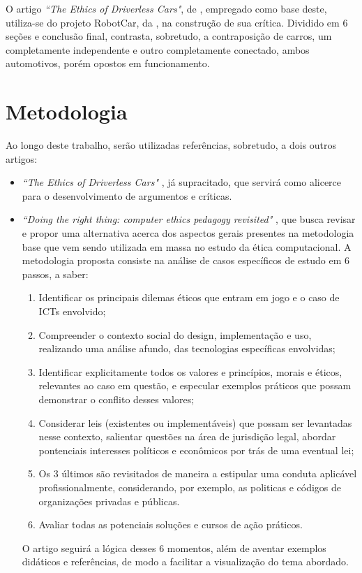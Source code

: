 \documentclass[12pt]{article}
\begin{document}
		O artigo \emph{``The Ethics of Driverless Cars"}, de \citet{mcbride_ethics_2016}, empregado como base deste, utiliza-se do projeto RobotCar, da \citet{oxford_robotics_institute_robotcar_nodate}, na construção de sua crítica. Dividido em 6 seções e conclusão final, contrasta, sobretudo, a contraposição de carros, um completamente independente e outro completamente conectado, ambos automotivos, porém opostos em funcionamento.
		
	\section{\label{metodologia}Metodologia} 
		
		Ao longo deste trabalho, serão utilizadas referências, sobretudo, a dois outros artigos:
		\begin{itemize}
			\item \emph{``The Ethics of Driverless Cars"} \citep{mcbride_ethics_2016}, já supracitado, que servirá como alicerce para o desenvolvimento de argumentos e críticas.
			\item \emph{``Doing the right thing: computer ethics pedagogy revisited"} \citep{jones_doing_2016}, que busca revisar e propor uma alternativa acerca dos aspectos gerais presentes na metodologia base que vem sendo utilizada em massa no estudo da ética computacional. A metodologia proposta consiste na análise de casos específicos de estudo em 6 passos, a saber:
			\begin{enumerate}
				\item Identificar os principais dilemas éticos que entram em jogo e o caso de ICTs envolvido;
				\item Compreender o contexto social do design, implementação e uso, realizando uma análise afundo, das tecnologias específicas envolvidas;
				\item Identificar explicitamente todos os valores e princípios, morais e éticos, relevantes ao caso em questão, e especular exemplos práticos que possam demonstrar o conflito desses valores;
				\item Considerar leis (existentes ou implementáveis) que possam ser levantadas nesse contexto, salientar questões na área de jurisdição legal, abordar pontenciais interesses políticos e econômicos por trás de uma eventual lei;
				\item Os 3 últimos são revisitados de maneira a estipular uma conduta aplicável profissionalmente, considerando, por exemplo, as politicas e códigos de organizações privadas e públicas.
				\item Avaliar todas as potenciais soluções e cursos de ação práticos.
			\end{enumerate}
		O artigo seguirá a lógica desses 6 momentos, além de aventar exemplos didáticos e referências, de modo a facilitar a visualização do tema abordado.
		\end{itemize}
		
\end{document}
